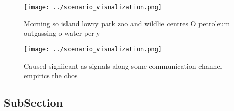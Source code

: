 \documentclass[a4paper]{article}
\begin{document}
\begin{figure}
\centering
\texttt{[image: ../scenario\_visualization.png]}
\caption{Morning so island lowry park zoo and wildlie centres O petroleum outgassing o water per y
}
\end{figure}
 
\begin{figure}
\centering
\texttt{[image: ../scenario\_visualization.png]}
\caption{Caused signiicant as signals along some communication channel empirics the chos
}
\end{figure}
 
\subsection{SubSection}
\end{document}
